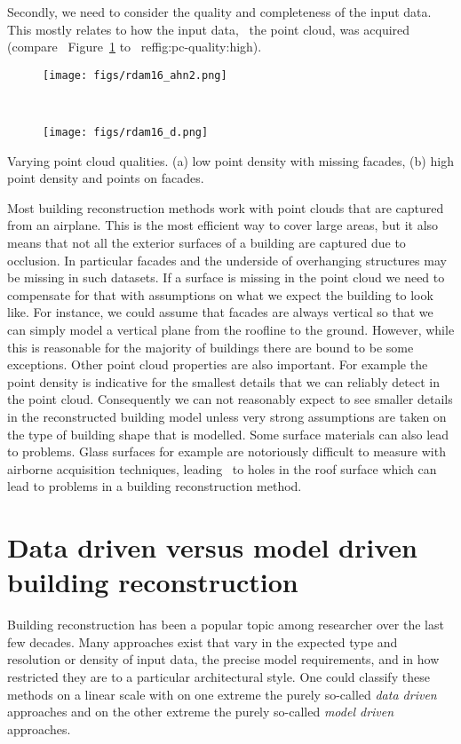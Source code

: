 Secondly, we need to consider the quality and completeness of the input data. This mostly relates to how the input data, \ie\ the point cloud, was acquired (compare \eg\ Figure~\ref{fig:pc-quality:low} to
~ref{fig:pc-quality:high}).
\begin{marginfigure}
	\centering
	\begin{subfigure}{\linewidth}
		\texttt{[image: figs/rdam16\_ahn2.png]}
		\caption{}%
		\label{fig:pc-quality:low}
	\end{subfigure}
	\\
	\begin{subfigure}{\linewidth}
		\texttt{[image: figs/rdam16\_d.png]}
		\caption{}%
		\label{fig:pc-quality:high}
	\end{subfigure}
	\caption[Varying point cloud qualities]{Varying point cloud qualities. (a) low point density with missing facades, (b) high point density and points on facades.}%
	\label{fig:pc-quality}
\end{marginfigure}
Most building reconstruction methods work with point clouds that are captured from an airplane. 
This is the most efficient way to cover large areas, but it also means that not all the exterior surfaces of a building are captured due to occlusion. In particular facades and the underside of overhanging structures may be missing in such datasets. 
If a surface is missing in the point cloud we need to compensate for that with assumptions on what we expect the building to look like. 
For instance, we could assume that facades are always vertical so that we can simply model a vertical plane from the roofline to the ground. 
However, while this is reasonable for the majority of buildings there are bound to be some exceptions.
Other point cloud properties are also important. For example the point density is indicative for the smallest details that we can reliably detect in the point cloud. Consequently we can not reasonably expect to see smaller details in the reconstructed building model unless very strong assumptions are taken on the type of building shape that is modelled. Some surface materials can also lead to problems. Glass surfaces for example are notoriously difficult to measure with airborne acquisition techniques, leading \eg\ to holes in the roof surface which can lead to problems in a building reconstruction method.


%
\section{Data driven versus model driven building reconstruction}
Building reconstruction has been a popular topic among researcher over the last few decades. 
Many approaches exist that vary in the expected type and resolution or density of input data, the precise model requirements, and in how restricted they are to a particular architectural style.
One could classify these methods on a linear scale with on one extreme the purely so-called \emph{data  driven} approaches and on the other extreme the purely so-called \emph{model driven} approaches.

